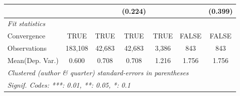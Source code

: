 \begin{tabular}{lcccccc}
                           &              &         & (0.224)      &              &         & (0.399)\\   
   \midrule
   \emph{Fit statistics}\\
   Convergence             &TRUE          & TRUE    & TRUE         & TRUE         & FALSE   & FALSE\\  
   Observations            & 183,108      & 42,683  & 42,683       & 3,386        & 843     & 843\\  
Mean(Dep. Var.) & 0.600 & 0.708 & 0.708 & 1.216 & 1.756 & 1.756 \\
   \midrule \midrule
   \multicolumn{7}{l}{\emph{Clustered (author \& quarter) standard-errors in parentheses}}\\
   \multicolumn{7}{l}{\emph{Signif. Codes: ***: 0.01, **: 0.05, *: 0.1}}\\
\end{tabular}
\par\endgroup
